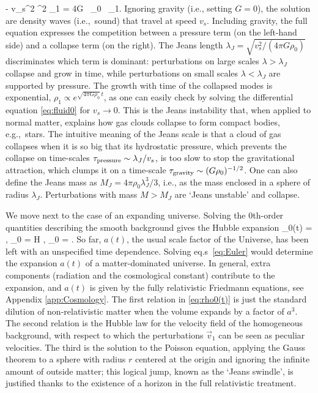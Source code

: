 \beq
\label{eq:fluid0}  
 - v_s^2 \nabla^2 \rho_1 = 4\pi G \, \rho_0 \, \rho_1.
\eeq
Ignoring gravity (i.e., setting $G=0$), the solution are density waves (i.e.,~sound) that travel at speed $v_s$. Including gravity, the full equation expresses the competition between a pressure term (on the left-hand side) and a collapse term (on the right). The Jeans length $\lambda_J = \sqrt{v_s^2/(4 \pi G \rho_0)}$ discriminates which term is dominant: perturbations on large scales $\lambda > \lambda_J$  collapse and grow in time, while perturbations on small scales $\lambda < \lambda_J$ are supported by pressure. The growth with time of the collapsed modes is exponential, $\rho_1 \propto e^{\sqrt{4\pi G \rho_0}\, t}$, as one can easily check by solving the differential equation \eqref{eq:fluid0} for $v_s\to0$. 
This is the Jeans instability that, when applied to normal matter, explains how gas clouds collapse to form compact bodies, e.g.,~stars.
The intuitive meaning of the Jeans scale is that a cloud of gas collapses when it is so big that its hydrostatic pressure, 
which prevents the collapse on time-scales $\tau_{\rm pressure} \sim \lambda_J/v_s $,
is too slow to stop the gravitational attraction, which clumps it on a time-scale  $ \tau_{\rm gravity}\sim (G \rho_0)^{-1/2}$.
One can also define the Jeans mass as $M_J = 4\pi \rho_0 \lambda_J^3/3$, i.e.,  as the mass enclosed in a sphere of radius $\lambda_J$. Perturbations with mass $M > M_J$ are `Jeans unstable' and  collapse.

\medskip

We move next to the  case of an expanding universe. 
Solving the 0th-order quantities describing the smooth background gives the Hubble expansion
\beq\label{eq:rho0(t)}
\rho_0(t) = ,\qquad
{}_0 = H ,\qquad
\vec{\nabla}\Phi_0 = .
\eeq
So far, $a(t)$, the usual scale factor of the Universe, has been left with an unspecified time dependence.
Solving eq.s~\eqref{eq:Euler} would determine the expansion $a(t)$ of a matter-dominated universe.
In general, extra components (radiation and the cosmological constant) contribute to the expansion,
and $a(t)$ is given by the fully relativistic Friedmann equations, see Appendix \ref{app:Cosmology}.
The first relation in \eqref{eq:rho0(t)} is just the standard dilution of non-relativistic matter when the volume expands by a factor of $a^3$. 
The second relation is the Hubble law for the velocity field of the homogeneous background, with respect to which the perturbations $\vec v_1$ can be seen as peculiar velocities. 
The third is the solution to the Poisson equation, applying the Gauss theorem to a sphere with radius $r$
centered at the origin and ignoring the infinite amount of outside matter;
this logical jump, known as the `Jeans swindle', is justified thanks to the existence of a horizon in the full relativistic treatment.

